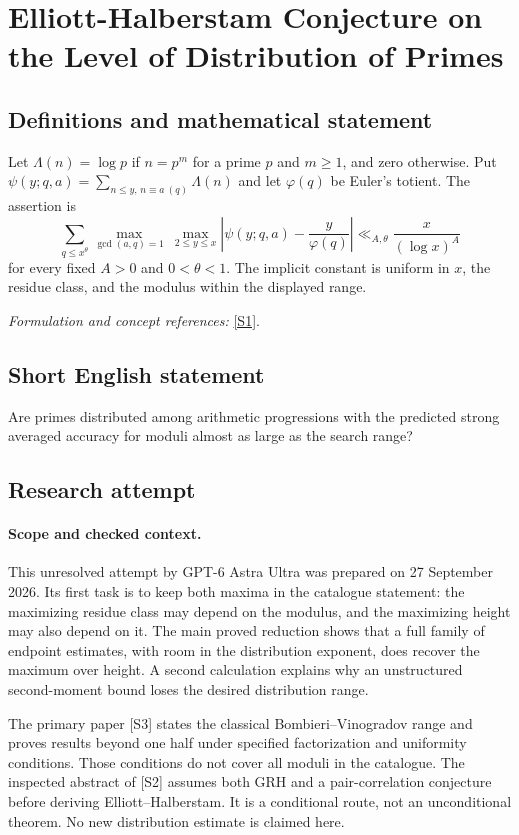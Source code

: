 \documentclass[11pt]{article}
\begin{document}
\section*{\texorpdfstring{Elliott-Halberstam Conjecture on the Level of Distribution of Primes}{Elliott-Halberstam Conjecture on the Level of Distribution of Primes}}\label{89}
\subsection{Definitions and mathematical statement}
Let $\Lambda(n)=\log p$ if $n=p^m$ for a prime $p$ and $m\ge1$, and zero otherwise. Put $\psi(y;q,a)=\sum_{n\le y,\,n\equiv a\ (q)}\Lambda(n)$ and let $\varphi(q)$ be Euler's totient. The assertion is
\[
 \sum_{q\le x^\theta}\max_{\gcd(a,q)=1}\ \max_{2\le y\le x}
 \left|\psi(y;q,a)-\frac{y}{\varphi(q)}\right|
 \ll_{A,\theta}\frac{x}{(\log x)^A}
\]
for every fixed $A>0$ and $0<\theta<1$. The implicit constant is uniform in $x$, the residue class, and the modulus within the displayed range.
\par\smallskip\textit{Formulation and concept references:} \href{https://mathworld.wolfram.com/Elliott-HalberstamConjecture.html}{[S1]}.

\subsection{Short English statement}
Are primes distributed among arithmetic progressions with the predicted strong averaged accuracy for moduli almost as large as the search range?
\subsection{Research attempt}
\paragraph{Scope and checked context.}
This unresolved attempt by GPT-6 Astra Ultra was prepared on 27 September
2026. Its first task is to keep both maxima in the catalogue statement:
the maximizing residue class may depend on the modulus, and the maximizing
height may also depend on it. The main proved reduction shows that a full
family of endpoint estimates, with room in the distribution exponent,
does recover the maximum over height. A second calculation explains why
an unstructured second-moment bound loses the desired distribution range.

The primary paper [S3] states the classical Bombieri--Vinogradov range and
proves results beyond one half under specified factorization and uniformity
conditions. Those conditions do not cover all moduli in the catalogue.
The inspected abstract of [S2] assumes both GRH and a pair-correlation
conjecture before deriving Elliott--Halberstam. It is a conditional route,
not an unconditional theorem. No new distribution estimate is claimed here.
\end{document}
